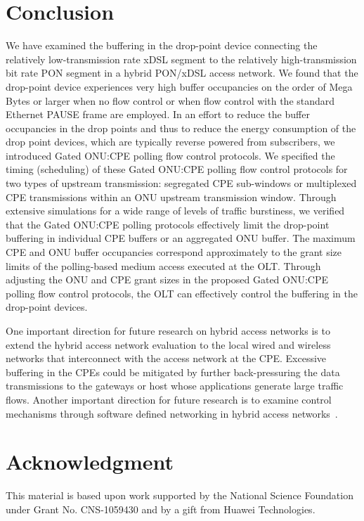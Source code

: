 \documentclass[pdftex,journal]{IEEEtran}
\begin{document}
\section{Conclusion}  \label{sec:conclusion}
We have examined the buffering in the drop-point device connecting
the relatively low-transmission rate xDSL segment to the relatively
high-transmission bit rate PON segment in a hybrid PON/xDSL access
network. We found that the drop-point device experiences very high
buffer occupancies on the order of Mega Bytes or larger when no flow
control or when flow control with the standard Ethernet PAUSE frame
are employed. In an effort to reduce the buffer occupancies in the
drop points and thus to reduce the energy consumption of the drop
point devices, which are typically reverse powered from subscribers,
we introduced Gated ONU:CPE polling flow control protocols. We
specified the timing (scheduling) of these Gated ONU:CPE polling
flow control protocols for two types of upstream transmission:
segregated CPE sub-windows or
 multiplexed CPE transmissions within an ONU
upstream transmission window. Through extensive simulations for a
wide range of levels of traffic burstiness, we verified that the
Gated ONU:CPE polling protocols effectively limit the drop-point
buffering in individual CPE buffers or an aggregated ONU buffer. The
maximum CPE and ONU buffer occupancies correspond approximately to
the grant size limits of the polling-based medium access executed at
the OLT. Through adjusting the ONU and CPE grant sizes in the
proposed Gated ONU:CPE polling flow control protocols, the OLT can
effectively control the buffering in the drop-point devices.

One important direction for future research on
hybrid access networks is to extend the hybrid access
network evaluation to the local wired and wireless networks that
interconnect with the access network at the CPE.
Excessive buffering in the CPEs could be mitigated by further back-pressuring
the data transmissions to the gateways or host whose applications
generate large traffic flows.
Another important direction for future research is to examine
control mechanisms through software defined networking in hybrid
access networks~\cite{ker2014sof}.

\section*{Acknowledgment}
This material is based upon work supported by the National Science
Foundation under Grant No. CNS-1059430 and by a gift from Huawei
Technologies.
\end{document}
